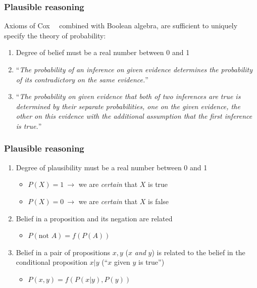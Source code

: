 \begin{frame}

\frametitle{Plausible reasoning}
\label{plausiblereasoning}

Axioms of Cox~\citep{Cox:1946}~\citep{Cox:1961} combined with Boolean algebra, are sufficient to uniquely
specify the theory of probability:

\begin{enumerate}
\item Degree of belief must be a real number between 0 and 1

\item ``\emph{The probability of an inference on given evidence determines the probability of its
contradictory on the same evidence.}''

\item ``\emph{The probability on given evidence that both of two inferences are true is determined by their
separate probabilities, one on the given evidence, the other on this evidence with the additional
assumption that the first inference is true.}''

\end{enumerate}

\end{frame}

\begin{frame}

\frametitle{Plausible reasoning}
\label{plausiblereasoning}

\begin{enumerate}
\item Degree of plausibility must be a real number between 0 and 1

\begin{itemize}
\item $P(X) = 1~\rightarrow$ we are \emph{certain} that $X$ is true

\item $P(X) = 0~\rightarrow$ we are \emph{certain} that $X$ is false

\end{itemize}

\item Belief in a proposition and its negation are related

\begin{itemize}
\item $P(\text{not } A) = f(P(A))$

\end{itemize}

\item Belief in a pair of propositions $x,y$ ($x$ \emph{and} $y$) is related to the belief in the
conditional proposition $x|y$ (``$x$ given $y$ is true'')

\begin{itemize}
\item $P(x,y) = f(P(x|y), P(y))$

\end{itemize}

\end{enumerate}

\end{frame}


